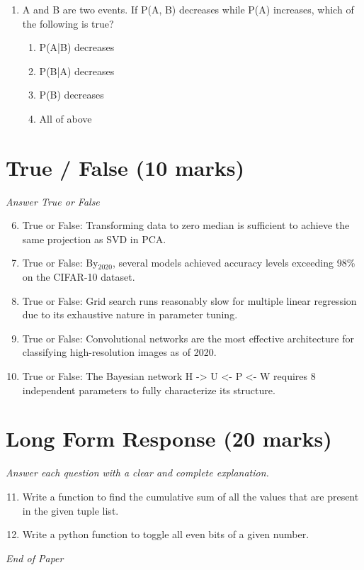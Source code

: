 \documentclass[12pt]{article}
\begin{document}
\begin{enumerate}[label=\arabic*.]
\begin{enumerate}[label=(\alph*)]
    \item True, False
    \item False, True
\end{enumerate}
\item A and B are two events. If P(A, B) decreases while P(A) increases, which of the following is true?
\begin{enumerate}[label=(\alph*)]
    \item P(A|B) decreases
    \item P(B|A) decreases
    \item P(B) decreases
    \item All of above
\end{enumerate}
\end{enumerate}

\section*{True / False (10 marks)}
\textit{Answer True or False}
\begin{enumerate}[label=\arabic*.]
\setcounter{enumi}{5}
\item True or False: Transforming data to zero median is sufficient to achieve the same projection as SVD in PCA.
\item True or False: By$_{2020}$, several models achieved accuracy levels exceeding 98\% on the CIFAR-10 dataset.
\item True or False: Grid search runs reasonably slow for multiple linear regression due to its exhaustive nature in parameter tuning.
\item True or False: Convolutional networks are the most effective architecture for classifying high-resolution images as of 2020.
\item True or False: The Bayesian network H -\textgreater{} U \textless{}- P \textless{}- W requires 8 independent parameters to fully characterize its structure.
\end{enumerate}

\section*{Long Form Response (20 marks)}
\textit{Answer each question with a clear and complete explanation.}
\begin{enumerate}[label=\arabic*.]
\setcounter{enumi}{10}
\item Write a function to find the cumulative sum of all the values that are present in the given tuple list.
\item Write a python function to toggle all even bits of a given number.
\end{enumerate}

\vfill
\noindent\textit{End of Paper}
\end{document}

